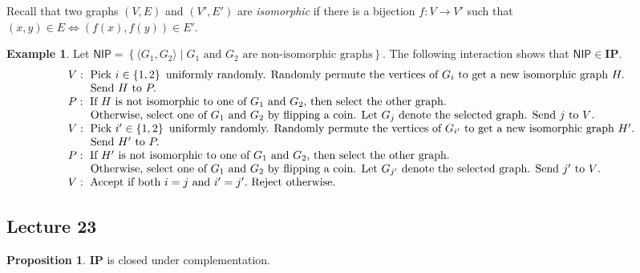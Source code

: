 \documentclass[10pt,letterpaper,cm]{nupset}
\theoremstyle{definition}
\newtheorem{exmp}[definition]{Example}
\theoremstyle{theorem}
\newtheorem{prop}[definition]{Proposition}
\theoremstyle{remark}
\newcommand{\1}{\mathbf{1}}
\newcommand{\0}{\vec 0}
\begin{document}
\smallskip

Recall that two graphs $\left(V, E\right)$ and $\left(V', E'\right)$ are \textit{isomorphic} if there is a bijection $f: V \to V'$ such that $\left(x,y\right) \in E \iff \left(f(x), f(y)\right)\in E'$.

\begin{exmp}
Let $\mathsf{NIP}=  \left\{ \langle G_1, G_2 \rangle \mid G_1 \text{ and }G_2 \text{ are non-isomorphic graphs}\right\}$. The following interaction shows that $\mathsf{NIP} \in \mathbf{IP}$.
\[
\begin{array}{l}{V : \text { Pick } i \in \left\{1,2\right\} \text { uniformly randomly. Randomly permute the vertices of } G_{i} \text { to get a  new isomorphic graph } H .} \\ {\text {\quad \quad Send } H \text { to } P .} \\ {P : \text { If } H \text { is not isomorphic to one of } G_1 \text{ and } G_2 \text {, then select the other graph. }} \\ {
\text {\quad \quad Otherwise, select one of } G_1 \text{ and } G_2 \text { by flipping a coin. Let } G_j \text{ denote the selected graph. Send } j \text { to } V \text {. }} \\
{V : \text { Pick } i' \in \left\{1,2\right\} \text { uniformly randomly. Randomly permute the vertices of } G_{i'} \text { to get a new isomorphic graph } H' .} \\ { \text {\quad \quad Send } H' \text { to } P .} \\ {P : \text { If } H' \text { is not isomorphic to one of } G_1 \text{ and } G_2 \text {, then select the other graph. }} \\ {
\text {\quad \quad Otherwise, select one of } G_1 \text{ and } G_2 \text { by flipping a coin. Let } G_{j'} \text{ denote the selected graph. Send } j' \text { to } V \text {. }}
\\ {V : \text { Accept if both } i=j \text{ and } i' =j'. \text { Reject otherwise. }}\end{array}
\] 
\end{exmp}

\subsection{Lecture 23}

\begin{prop}
$\mathbf{IP}$ is closed under complementation. 
\end{prop}
\end{document}
